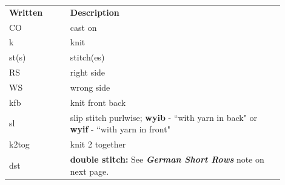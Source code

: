\documentclass[12pt]{article}
\renewcommand{\arraystretch}{2} %
\newcommand{\vocab}[1]{\emph{\textbf{#1}}} %
\begin{document}
\begin{titlingpage}
\begin{multicols}{2}
\begin{center}
{\renewcommand{\arraystretch}{1.2}
\begin{tabular}{| C{0.2\linewidth}  p{0.7\linewidth} | }
\thickhline {} 
\textbf{Written}	& \textbf{Description} \\ \thickhline
CO 	& cast on \\
k	& knit \\
st(s)	& stitch(es) \\
RS	& right side \\
WS	& wrong side \\
kfb 	& knit front back \\
sl 	& slip stitch purlwise; \hfill\hfill \linebreak
\textbf{wyib} - ``with yarn in back" \hfill\hfill \linebreak
or \textbf{wyif} - ``with yarn in front" \\
k2tog 	& knit 2 together \\
dst	& \textbf{double stitch:} See \vocab{German Short Rows} note on next page. \\
\hline
\end{tabular}}
\end{center}
\vfill ~

\end{multicols}
\end{titlingpage}
\end{document}
